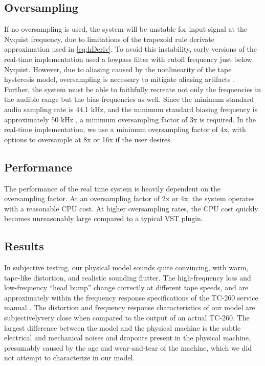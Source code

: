 \documentclass[twoside,a4paper]{article}
\begin{document}
\subsection{Oversampling}
If no oversampling is used, the system will be unstable
for input signal at the Nyquist frequency, due to limitations
of the trapezoid rule derivate approximation used in \cref{eq:hDeriv}.
To avoid this instability, early versions of the real-time
implementation used a lowpass filter with cutoff frequency
just below Nyquist. However, due to aliasing caused by the
nonlinearity of the tape hysteresis model, oversampling is
necessary to mitigate aliasing artifacts \cite{Yeh}. Further,
the system must be able to faithfully recreate not only the
frequencies in the audible range but the bias frequencies as
well. Since the minimum standard audio sampling rate is 44.1
kHz, and the minimum standard biasing frequency is approximately
50 kHz \cite{Camras:1987:MRH:27189}, a minimum oversampling
factor of 3x is required. In the real-time implementation,
we use a minimum oversampling factor of 4x, with options to
oversample at 8x or 16x if the user desires.

\subsection{Performance}
The performance of the real time system is heavily
dependent on the oversampling factor. At an oversampling
factor of 2x or 4x, the system operates with a reasonable
CPU cost. At higher oversampling rates, the CPU cost quickly
becomes unreasonably large compared to a typical VST plugin.

\subsection{Results}
In subjective testing, our physical model sounds quite convincing,
with warm, tape-like distortion, and realistic sounding
flutter. The high-frequency loss and low-frequency
``head bump'' change correctly at different tape speeds,
and are approximately within the frequency response
specifications of the TC-260 service manual \cite{RefManual}.
The distortion and frequency response characteristics
of our model are subjectivelyvery close when compared to
the output of an actual TC-260.
The largest difference between the model and the physical
machine is the subtle electrical and mechanical noises
and dropouts present in the physical machine, presumably
caused by the age and wear-and-tear of the machine, which
we did not attempt to characterize in our model.
\newline\newline
\end{document}
